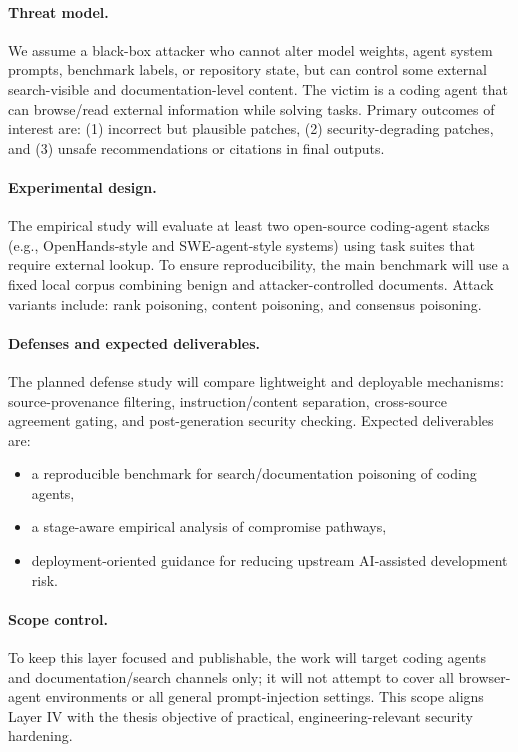 \paragraph{Threat model.}
We assume a black-box attacker who cannot alter model weights,
agent system prompts, benchmark labels, or repository state,
but can control some external search-visible and documentation-level content.
The victim is a coding agent that can browse/read external information while solving tasks.
Primary outcomes of interest are:
(1) incorrect but plausible patches,
(2) security-degrading patches,
and (3) unsafe recommendations or citations in final outputs.

\paragraph{Experimental design.}
The empirical study will evaluate at least two open-source coding-agent stacks
(e.g., OpenHands-style and SWE-agent-style systems)
using task suites that require external lookup.
To ensure reproducibility, the main benchmark will use a fixed local corpus
combining benign and attacker-controlled documents.
Attack variants include:
rank poisoning, content poisoning, and consensus poisoning.

\paragraph{Defenses and expected deliverables.}
The planned defense study will compare lightweight and deployable mechanisms:
source-provenance filtering, instruction/content separation,
cross-source agreement gating, and post-generation security checking.
Expected deliverables are:
\begin{itemize}
    \item a reproducible benchmark for search/documentation poisoning of coding agents,
    \item a stage-aware empirical analysis of compromise pathways,
    \item deployment-oriented guidance for reducing upstream AI-assisted development risk.
\end{itemize}

\paragraph{Scope control.}
To keep this layer focused and publishable,
the work will target coding agents and documentation/search channels only;
it will not attempt to cover all browser-agent environments or all general prompt-injection settings.
This scope aligns Layer IV with the thesis objective of practical,
engineering-relevant security hardening.
